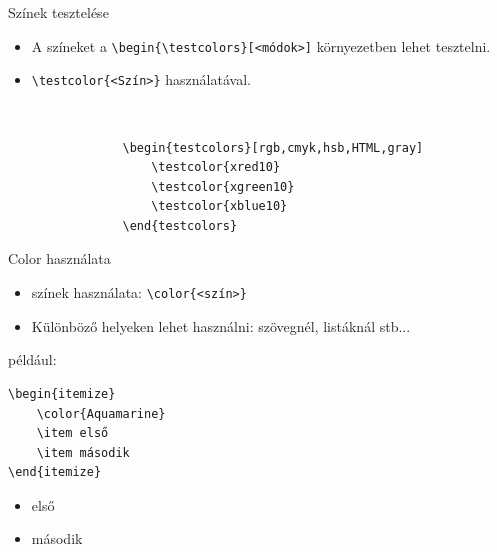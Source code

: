 \documentclass[aspectratio=1610, dvipsnames, xcolor=table]{beamer}
\begin{document}
    \begin{frame}[fragile]{Színek tesztelése}
        \begin{itemize}
            \item {} A színeket a \verb!\begin{\testcolors}[<módok>]! környezetben lehet tesztelni.
            \item {} \verb!\testcolor{<Szín>}! használatával.
        \end{itemize}
        \begin{exampleblock}{\textcolor{white}{A korábban definiált színek tesztelése Különböző módokban.}}
            \begin{verbatim}
                \begin{testcolors}[rgb,cmyk,hsb,HTML,gray]
                    \testcolor{xred10}
                    \testcolor{xgreen10}
                    \testcolor{xblue10}
                \end{testcolors}    
            \end{verbatim}    
        \end{exampleblock}
        
        \begin{testcolors}
        \end{testcolors}
    \end{frame}

    \begin{frame}[fragile]{Color használata}
        \begin{minipage}{0.6\textwidth}
            \begin{itemize}            
                \item {} színek használata: \verb!\color{<szín>}!
                \item {} Különböző helyeken lehet használni: szövegnél, listáknál stb...    
            \end{itemize}
        \end{minipage}
        \begin{minipage}{0.35\textwidth}
            
                 például:
                 \begin{verbatim}\begin{itemize}
    \color{Aquamarine}
    \item első
    \item második
\end{itemize}\end{verbatim}
                  \begin{itemize}
                    \color{Aquamarine}
                    \item első
                    \item második
                \end{itemize}
        \end{minipage}
    \end{frame}
       
\end{document}

